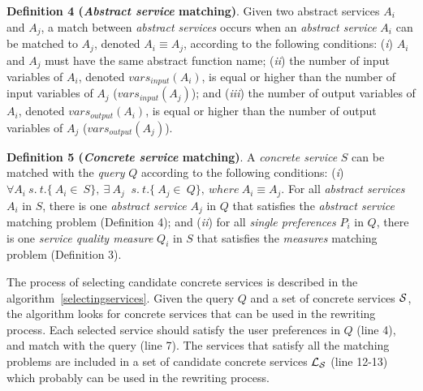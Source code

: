 \noindent \textbf{Definition 4 (\textit{Abstract service} matching)}.
Given two abstract services $A_{i}$ and $A_{j}$, a match between \textit{abstract services} occurs when an \textit{abstract service} $A_{i}$ can be matched to $A_{j}$, denoted $A_{i} \equiv A_{j}$, according to the following conditions: 
(\textit{i}) $A_{i}$ and $A_{j}$ must have the same abstract function name; 
(\textit{ii}) the number of input variables of $A_{i}$, denoted $vars_{input}(A_{i})$, is equal or higher than the number of input variables of $A_{j}$ ($vars_{input}(A_{j})$); and 
(\textit{iii}) the number of output variables of $A_{i}$, denoted $vars_{output}(A_{i})$, is equal or higher than the number of output variables of $A_{j}$ ($vars_{output}(A_{j})$).
\bigskip

\noindent \textbf{Definition 5 (\textit{Concrete service} matching)}.
A \textit{concrete service} $S$ can be matched with the \textit{query} $Q$ according to the following conditions:
(\textit{i}) $\forall A_{i}  \ s. \ t. \lbrace\ A_{i} \in \ S\rbrace, \ \exists \ A_{j} \ $ $s. \ t. \lbrace\ A_{j} \in \ Q\rbrace, \ where \ A_{i} \equiv A_{j}.$ For all \textit{abstract services} $A_{i}$ in $S$, there is one \textit{abstract service} $A_{j}$ in $Q$ that satisfies the \textit{abstract service} matching problem (Definition 4); and (\textit{ii}) for all \textit{single preferences} $P_{i}$ in $Q$, there is one
\textit{service quality measure} $Q_{i}$ in $S$ that satisfies the \textit{measures} matching problem (Definition 3).


The process of selecting candidate concrete services
is described in the algorithm~\ref{selectingservices}.
Given the query $Q$ and a set of concrete services $\hbox{${\cal S}$}$, the algorithm
looks for concrete services that can be used in the rewriting process.
Each selected service should satisfy the user preferences in $Q$ (line 4), and match with the query (line 7).
The services that satisfy all the matching problems are included in a set of candidate concrete services $\hbox{${\cal L_{S}}$}$ (line 12-13) which probably can be used in the rewriting process.


